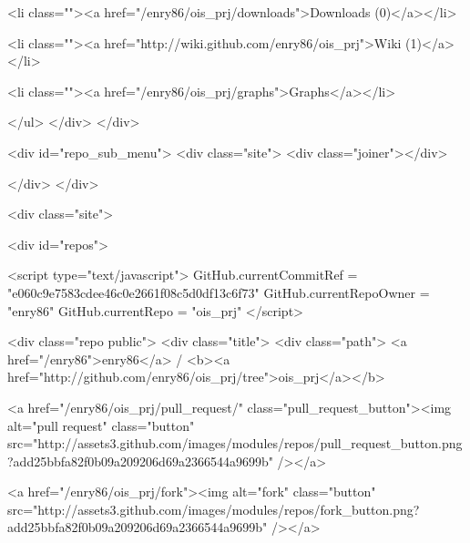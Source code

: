               <li class=""><a href="/enry86/ois_prj/downloads">Downloads (0)</a></li>
            

            
              
              <li class=""><a href="http://wiki.github.com/enry86/ois_prj">Wiki (1)</a></li>
            

            <li class=""><a href="/enry86/ois_prj/graphs">Graphs</a></li>

            

          
        </ul>
      </div>
    </div>

  <div id="repo_sub_menu">
    <div class="site">
      <div class="joiner"></div>
      

      

      

      
    </div>
  </div>

  <div class="site">
    





<div id="repos">
  


<script type="text/javascript">
  GitHub.currentCommitRef = "e060c9e7583cdee46c0e2661f08c5d0df13c6f73"
  GitHub.currentRepoOwner = "enry86"
  GitHub.currentRepo = "ois_prj"
</script>



  <div class="repo public">
    <div class="title">
      <div class="path">
        <a href="/enry86">enry86</a> / <b><a href="http://github.com/enry86/ois_prj/tree">ois_prj</a></b>

        

          

          
            
              
                <a href="/enry86/ois_prj/pull_request/" class="pull_request_button"><img alt="pull request" class="button" src="http://assets3.github.com/images/modules/repos/pull_request_button.png?add25bbfa82f0b09a209206d69a2366544a9699b" /></a>
              
            

            
              
                
                <a href="/enry86/ois_prj/fork"><img alt="fork" class="button" src="http://assets3.github.com/images/modules/repos/fork_button.png?add25bbfa82f0b09a209206d69a2366544a9699b" /></a>
              
            
          

